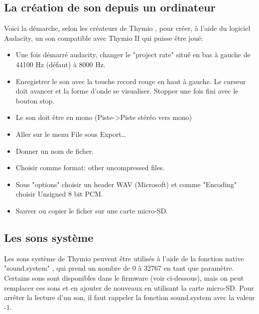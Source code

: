 \documentclass[a4paper, 12pt]{report}
\begin{document}
\subsection{La création de son depuis un ordinateur}
Voici la démarche, selon les créateurs de Thymio \pageref{thymio}, pour créer, à l'aide du logiciel Audacity, un son compatible avec Thymio II qui puisse être joué:\\
\begin{itemize}
\item Une fois démarré audacity, changer le "project rate" situé en bas à gauche de 44100 Hz (défaut) à 8000 Hz.
\item Enregistrer le son avec la touche record rouge en haut à gauche. Le curseur doit avancer et la forme d'onde se visualiser. Stopper une fois fini avec le bouton stop.
\item Le son doit être en mono (Piste->Piste stéréo vers mono)
\item Aller sur le menu File sous Export…
\item Donner un nom de ficher.
\item Choisir comme format: other uncompressed files.
\item Sous "options" choisir un header WAV (Microsoft) et comme "Encoding" choisir Unsigned 8 bit PCM.
\item Sauver ou copier le ficher sur une carte micro-SD.
\end{itemize}

\subsection{Les sons système}
Les sons système de Thymio \pageref{thymio} peuvent être utilisés à l'aide de la fonction native "sound.system" , qui prend un nombre de 0 à 32767 en tant que paramètre. Certains sons sont disponibles dans le firmware (voir ci-dessous), mais on peut remplacer ces sons et en ajouter de nouveaux en utilisant la carte micro-SD. Pour arrêter la lecture d'un son, il faut rappeler la fonction sound.system avec la valeur -1.
\end{document}
